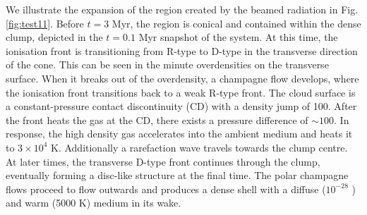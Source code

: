 \documentclass[useAMS,usenatbib]{mn2e}
\begin{document}
We illustrate the expansion of the \hii region created by the
beamed radiation in Fig. \ref{fig:test11}.  Before $t = 3$ Myr, the
\hii region is conical and contained within the dense clump,
depicted in the $t = 0.1$ Myr snapshot of the system.  At this time,
the ionisation front is transitioning from R-type to D-type in the
transverse direction of the cone.  This can be seen in the minute
overdensities on the \hii transverse surface.  When it breaks
out of the overdensity, a champagne flow develops, where the
ionisation front transitions back to a weak R-type front.  The cloud
surface is a constant-pressure contact discontinuity (CD) with a
density jump of 100.  After the front heats the gas at the CD, there
exists a pressure difference of $\sim 100$.  In response, the high
density gas accelerates into the ambient medium and heats it to $3
\times 10^4$ K.  Additionally a rarefaction wave travels towards the
clump centre.  At later times, the transverse D-type front continues
through the clump, eventually forming a disc-like structure at the
final time.  The polar champagne flows proceed to flow outwards and
produces a dense shell with a diffuse ($10^{-28}$ \cubecm) and warm
(5000 K) medium in its wake.

% 

\end{document}
